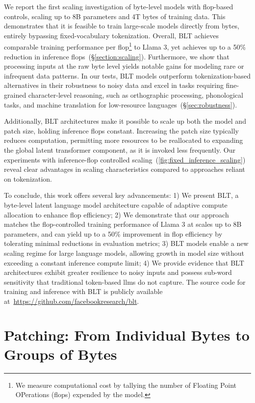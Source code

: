We report the first scaling investigation of byte-level models with flop-based controls, scaling up to 8B parameters and 4T bytes of training data. This demonstrates that it is feasible to train large-scale models directly from bytes, entirely bypassing fixed-vocabulary tokenization. Overall, {\textsc BLT} achieves comparable training performance per flop\footnote{We measure computational cost by tallying the number of Floating Point OPerations (flops) expended by the model.} to Llama 3, yet achieves up to a 50\% reduction in inference flops~(\S\ref{section:scaling}). Furthermore, we show that processing inputs at the raw byte level yields notable gains for modeling rare or infrequent data patterns. In our tests, {\textsc BLT} models outperform tokenization-based alternatives in their robustness to noisy data and excel in tasks requiring fine-grained character-level reasoning, such as orthographic processing, phonological tasks, and machine translation for low-resource languages~(\S\ref{sec:robustness}). 

Additionally, {\textsc BLT} architectures make it possible to scale up both the model and patch size, holding inference flops constant. Increasing the patch size typically reduces computation, permitting more resources to be reallocated to expanding the global latent transformer component, as it is invoked less frequently. Our experiments with inference-flop controlled scaling~(\autoref{fig:fixed_inference_scaling}) reveal clear advantages in scaling characteristics compared to approaches reliant on tokenization.

To conclude, this work offers several key advancements: 1) We present {\textsc BLT}, a byte-level latent language model architecture capable of adaptive compute allocation to enhance flop efficiency; 2) We demonstrate that our approach matches the flop-controlled training performance of Llama 3 at scales up to 8B parameters, and can yield up to a 50\% improvement in flop efficiency by tolerating minimal reductions in evaluation metrics; 3) {\textsc BLT} models enable a new scaling regime for large language models, allowing growth in model size without exceeding a constant inference compute limit; 4) We provide evidence that {\textsc BLT} architectures exhibit greater resilience to noisy inputs and possess sub-word sensitivity that traditional token-based llms do not capture. The source code for training and inference with {\textsc BLT} is publicly available at~\url{https://github.com/facebookresearch/blt}.

\section{Patching: From Individual Bytes to Groups of Bytes}
\label{section:patching}

